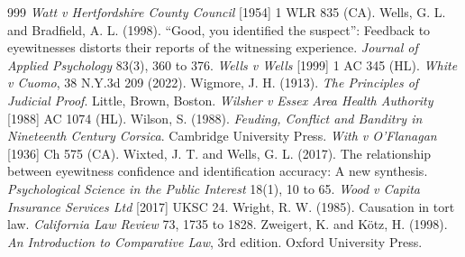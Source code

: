 \begin{thebibliography}{999}
 \emph{Watt v Hertfordshire County Council} [1954] 1 WLR 835 (CA).
 Wells, G. L. and Bradfield, A. L. (1998). ``Good, you identified the suspect'': Feedback to eyewitnesses distorts their reports of the witnessing experience. \emph{Journal of Applied Psychology} 83(3), 360 to 376.
 \emph{Wells v Wells} [1999] 1 AC 345 (HL).
 \emph{White v Cuomo}, 38 N.Y.3d 209 (2022).
 Wigmore, J. H. (1913). \emph{The Principles of Judicial Proof}. Little, Brown, Boston.
 \emph{Wilsher v Essex Area Health Authority} [1988] AC 1074 (HL).
 Wilson, S. (1988). \emph{Feuding, Conflict and Banditry in Nineteenth Century Corsica}. Cambridge University Press.
 \emph{With v O'Flanagan} [1936] Ch 575 (CA).
 Wixted, J. T. and Wells, G. L. (2017). The relationship between eyewitness confidence and identification accuracy: A new synthesis. \emph{Psychological Science in the Public Interest} 18(1), 10 to 65.
 \emph{Wood v Capita Insurance Services Ltd} [2017] UKSC 24.
 Wright, R. W. (1985). Causation in tort law. \emph{California Law Review} 73, 1735 to 1828.
 Zweigert, K. and K\"otz, H. (1998). \emph{An Introduction to Comparative Law}, 3rd edition. Oxford University Press.

\end{thebibliography}
\endgroup
